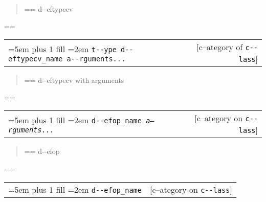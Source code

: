 \documentclass{book}
\makeatletter
\newenvironment{GNUTexinfopreformatted}{%
  \par\GNUTobeylines\obeyspaces\frenchspacing
  \parskip=\z@\parindent=\z@}{}
{\catcode`\^^M=13 \gdef\GNUTobeylines{\catcode`\^^M=13 \def^^M{\null\par}}}
\newenvironment{GNUTexinfoindented}
  {\begin{list}{}{}
  \item\relax}
  {\end{list}}
\makeatother
\begin{document}
\begin{GNUTexinfoindented}
%
\begin{quote}
\unskip{\parskip=0pt\noindent}%
\begin{GNUTexinfopreformatted}%
\ttfamily d{-}{-}eftypecv
\end{GNUTexinfopreformatted}
\end{quote}
\begin{GNUTexinfopreformatted}%
\ttfamily 
\end{GNUTexinfopreformatted}

\noindent\begin{tabularx}{\linewidth}{@{}Xr}
\rightskip=5em plus 1 fill
\hangindent=2em
\texttt{t{-}{-}ype d{-}{-}eftypecv\_name a{-}{-}rguments...}& [c--ategory of \texttt{c{-}{-}lass}]
\end{tabularx}

%
\begin{quote}
\unskip{\parskip=0pt\noindent}%
\begin{GNUTexinfopreformatted}%
\ttfamily d{-}{-}eftypecv with arguments
\end{GNUTexinfopreformatted}
\end{quote}
\begin{GNUTexinfopreformatted}%
\ttfamily 
\end{GNUTexinfopreformatted}

\noindent\begin{tabularx}{\linewidth}{@{}Xr}
\rightskip=5em plus 1 fill
\hangindent=2em
\texttt{d{-}{-}efop\_name \EmbracOn{}\textnormal{\textsl{a--rguments...}}\EmbracOff{}}& [c--ategory on \texttt{c{-}{-}lass}]
\end{tabularx}

%
\begin{quote}
\unskip{\parskip=0pt\noindent}%
\begin{GNUTexinfopreformatted}%
\ttfamily d{-}{-}efop
\end{GNUTexinfopreformatted}
\end{quote}
\begin{GNUTexinfopreformatted}%
\ttfamily 
\end{GNUTexinfopreformatted}

\noindent\begin{tabularx}{\linewidth}{@{}Xr}
\rightskip=5em plus 1 fill
\hangindent=2em
\texttt{d{-}{-}efop\_name}& [c--ategory on \texttt{c{-}{-}lass}]
\end{tabularx}


\end{GNUTexinfoindented}
\end{document}
